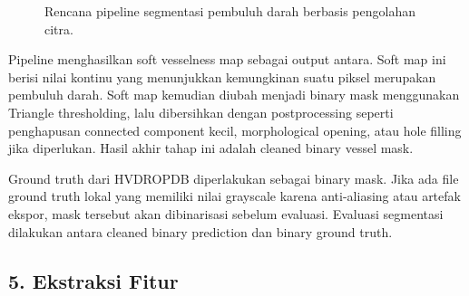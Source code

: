 \documentclass[12pt,a4paper]{article}
\begin{document}
\begin{figure}[h]
\centering
{}
\caption{Rencana pipeline segmentasi pembuluh darah berbasis pengolahan citra.}
\label{fig:vessel}
\end{figure}

Pipeline menghasilkan soft vesselness map sebagai output antara. Soft map ini berisi nilai kontinu yang menunjukkan kemungkinan suatu piksel merupakan pembuluh darah. Soft map kemudian diubah menjadi binary mask menggunakan Triangle thresholding, lalu dibersihkan dengan postprocessing seperti penghapusan connected component kecil, morphological opening, atau hole filling jika diperlukan. Hasil akhir tahap ini adalah cleaned binary vessel mask.

Ground truth dari HVDROPDB diperlakukan sebagai binary mask. Jika ada file ground truth lokal yang memiliki nilai grayscale karena anti-aliasing atau artefak ekspor, mask tersebut akan dibinarisasi sebelum evaluasi. Evaluasi segmentasi dilakukan antara cleaned binary prediction dan binary ground truth.

\subsection*{5. Ekstraksi Fitur}
\end{document}
